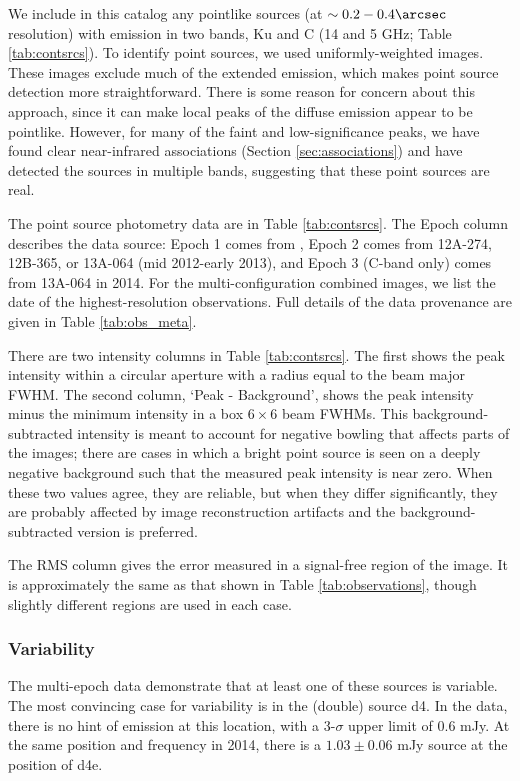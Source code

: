 

We include in this catalog any pointlike sources (at $\sim0.2-0.4\arcsec$
resolution) with emission in two bands, Ku and C (14 and 5 GHz; Table
\ref{tab:contsrcs}).  To identify point sources, we used uniformly-weighted
images.  These images exclude much of the extended emission, which makes point
source detection more straightforward.  There is some reason for concern about
this approach, since it can make local peaks of the diffuse emission appear to
be pointlike.  However, for many of the faint and low-significance peaks, we
have found clear near-infrared associations (Section \ref{sec:associations})
and have detected the sources in multiple bands, suggesting that these point
sources are real.

The point source photometry data are in Table \ref{tab:contsrcs}.  The Epoch column
describes the data source: Epoch 1 comes from \citet{Mehringer1994a}, Epoch 2
comes from 12A-274, 12B-365, or 13A-064 (mid 2012-early
2013), and Epoch 3 (C-band only) comes from
13A-064 in 2014. For the multi-configuration combined images, we list the date
of the highest-resolution observations.  Full details of the data provenance
are given in Table \ref{tab:obs_meta}.

There are two intensity columns in Table \ref{tab:contsrcs}.  The first shows
the peak intensity within a circular aperture with a radius equal to the beam
major FWHM.  The second column, `Peak - Background', shows the peak intensity
minus the minimum intensity in a box $6\times6$ beam FWHMs.  This
background-subtracted intensity is meant to account for negative bowling that
affects parts of the images; there are cases in which a bright point source is
seen on a deeply negative background such that the measured peak intensity is
near zero.  When these two values agree, they are reliable, but when they
differ significantly, they are probably affected by image reconstruction
artifacts and the background-subtracted version is preferred.

The RMS column gives the error measured in a signal-free region of the image.
It is approximately the same as that shown in Table \ref{tab:observations},
though slightly different regions are used in each case.




\subsubsection{Variability}
\label{sec:variability}
The multi-epoch data demonstrate that at least one of these sources is
variable.  The most convincing case for variability is in the (double) source
d4.  In the \citet{Mehringer1994a} data, there is no
hint of emission at this location, with a 3-$\sigma$ upper limit of 0.6 mJy.
At the same position and frequency in 2014, there is a $1.03 \pm 0.06$ mJy
source at the position of d4e. 


